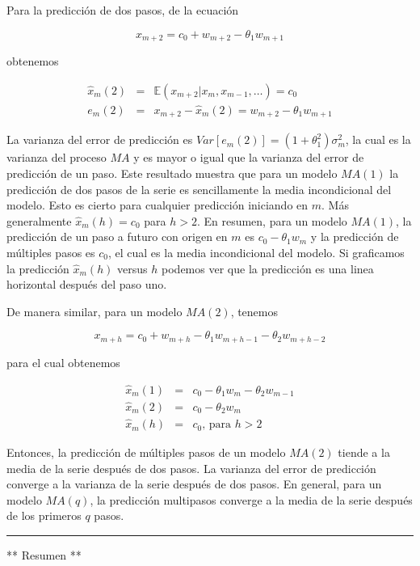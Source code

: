 \documentclass[12pt,]{krantz}
\theoremstyle{definition}
\theoremstyle{definition}
\theoremstyle{definition}
\theoremstyle{remark}
\begin{document}
Para la predicción de dos pasos, de la ecuación

\[x_{m+2}=c_0+w_{m+2}-\theta_1w_{m+1}\]

obtenemos

\begin{eqnarray*}
  \hat{x}_m(2) &=& \mathbb{E}(x_{m+2}|x_m,x_{m-1},\ldots)=c_0\\
  e_m(2) &=& x_{m+2}-\hat{x}_m(2) = w_{m+2}-\theta_1w_{m+1}
\end{eqnarray*}

La varianza del error de predicción es
\(Var[e_m(2)]=(1+\theta_1^2)\sigma_m^2\), la cual es la varianza del
proceso \(MA\) y es mayor o igual que la varianza del error de
predicción de un paso. Este resultado muestra que para un modelo
\(MA(1)\) la predicción de dos pasos de la serie es sencillamente la
media incondicional del modelo. Esto es cierto para cualquier predicción
iniciando en \(m\). Más generalmente \(\hat{x}_m(h)=c_0\) para \(h>2\).
En resumen, para un modelo \(MA(1)\), la predicción de un paso a futuro
con origen en \(m\) es \(c_0-\theta_1w_m\) y la predicción de múltiples
pasos es \(c_0\), el cual es la media incondicional del modelo. Si
graficamos la predicción \(\hat{x}_m(h)\) versus \(h\) podemos ver que
la predicción es una linea horizontal después del paso uno.

De manera similar, para un modelo \(MA(2)\), tenemos

\[x_{m+h} = c_0+w_{m+h}-\theta_1w_{m+h-1}-\theta_2w_{m+h-2}\]

para el cual obtenemos

\begin{eqnarray*}
 \hat{x}_m(1) &=& c_0-\theta_1w_m-\theta_2w_{m-1} \\
 \hat{x}_m(2) &=& c_0-\theta_2w_m \\
 \hat{x}_m(h) &=& c_0\text{, para }h>2
\end{eqnarray*}

Entonces, la predicción de múltiples pasos de un modelo \(MA(2)\) tiende
a la media de la serie después de dos pasos. La varianza del error de
predicción converge a la varianza de la serie después de dos pasos. En
general, para un modelo \(MA(q)\), la predicción multipasos converge a
la media de la serie después de los primeros \(q\) pasos.

\begin{center}\rule{0.5\linewidth}{\linethickness}\end{center}

** Resumen **
\end{document}
